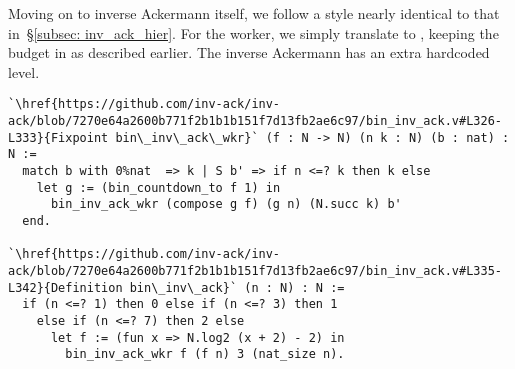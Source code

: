 Moving on to inverse Ackermann itself, we follow a style nearly identical to that
in~\S\ref{subsec: inv_ack_hier}. For the worker, we simply translate to
, keeping the budget in  as described earlier.
The inverse Ackermann has an extra hardcoded level.
\begin{lstlisting}
`\href{https://github.com/inv-ack/inv-ack/blob/7270e64a2600b771f2b1b1b151f7d13fb2ae6c97/bin_inv_ack.v#L326-L333}{Fixpoint bin\_inv\_ack\_wkr}` (f : N -> N) (n k : N) (b : nat) : N :=
  match b with 0%nat  => k | S b' => if n <=? k then k else
    let g := (bin_countdown_to f 1) in
      bin_inv_ack_wkr (compose g f) (g n) (N.succ k) b'
  end.

`\href{https://github.com/inv-ack/inv-ack/blob/7270e64a2600b771f2b1b1b151f7d13fb2ae6c97/bin_inv_ack.v#L335-L342}{Definition bin\_inv\_ack}` (n : N) : N :=
  if (n <=? 1) then 0 else if (n <=? 3) then 1
    else if (n <=? 7) then 2 else
      let f := (fun x => N.log2 (x + 2) - 2) in
        bin_inv_ack_wkr f (f n) 3 (nat_size n).
\end{lstlisting}

